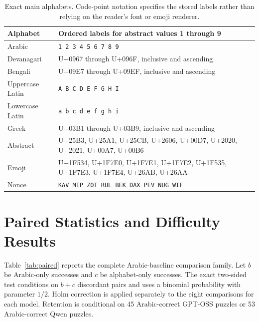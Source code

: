 \documentclass[11pt]{article}
\begin{document}
\begin{table}[t]
\centering\small
\begin{tabular}{lp{11.5cm}}
\toprule
Alphabet & Ordered labels for abstract values 1 through 9\\
\midrule
Arabic & \texttt{1 2 3 4 5 6 7 8 9}\\
Devanagari & U+0967 through U+096F, inclusive and ascending\\
Bengali & U+09E7 through U+09EF, inclusive and ascending\\
Uppercase Latin & \texttt{A B C D E F G H I}\\
Lowercase Latin & \texttt{a b c d e f g h i}\\
Greek & U+03B1 through U+03B9, inclusive and ascending\\
Abstract & U+25B3, U+25A1, U+25CB, U+2606, U+00D7, U+2020, U+2021, U+00A7, U+00B6\\
Emoji & U+1F534, U+1F7E0, U+1F7E1, U+1F7E2, U+1F535, U+1F7E3, U+1F7E4, U+26AB, U+26AA\\
Nonce & \texttt{KAV MIP ZOT RUL BEK DAX PEV NUG WIF}\\
\bottomrule
\end{tabular}
\caption{Exact main alphabets. Code-point notation specifies the stored labels rather than relying on the reader's font or emoji renderer.}
\label{tab:alphabets}
\end{table}

\section{Paired Statistics and Difficulty Results}\label{app:stats}
\begin{table}[t]
\centering\small

\caption{Main input and generation lengths and output failures by alphabet. Each row contains 60 requests. Input counts include chat-template overhead. Generated tokens include hidden reasoning and the final answer. Unparseability and incorrect truncation overlap and must not be added as exclusive categories.}
\label{tab:runtime_tokens}
\end{table}
Table~\ref{tab:paired} reports the complete Arabic-baseline comparison family. Let $b$ be Arabic-only successes and $c$ be alphabet-only successes. The exact two-sided test conditions on $b+c$ discordant pairs and uses a binomial probability with parameter $1/2$. Holm correction is applied separately to the eight comparisons for each model. Retention is conditional on 45 Arabic-correct GPT-OSS puzzles or 53 Arabic-correct Qwen puzzles.
\end{document}
